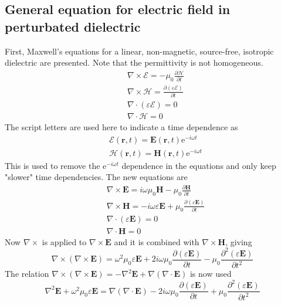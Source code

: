 \documentclass[10pt,a4paper]{eitExjobb}
\begin{document}
	\subsection{General equation for electric field in perturbated dielectric}
	First, Maxwell's equations for a linear, non-magnetic, source-free, isotropic dielectric are presented. Note that the permittivity is not homogeneous.
	\begin{align*}
	&\nabla \times \bm{\mathcal{E}} = -\mu_0 \frac{\partial \bm{\mathcal{H}}}{\partial t} \\
	&\nabla \times \bm{\mathcal{H}} = \frac{\partial (\varepsilon \bm{\mathcal{E}})}{\partial t} \\
	&\nabla \cdot (\varepsilon \bm{\mathcal{E}}) = 0 \\
	&\nabla \cdot \bm{\mathcal{H}} = 0
	\end{align*}
	The script letters are used here to indicate a time dependence as
	\begin{align*}
	&\bm{\mathcal{E}}(\bm{r},t) = \bm{E}(\bm{r},t) \text{e}^{-i\omega t} \\
	&\bm{\mathcal{H}}(\bm{r},t) = \bm{H}(\bm{r},t) \text{e}^{-i\omega t}
	\end{align*}
	This is used to remove the e$^{-i\omega t}$ dependence in the equations and only keep "slower" time dependencies. The new equations are
	\begin{align*}
	&\nabla \times \bm{E} = i\omega \mu_0 \bm{H} - \mu_0 \frac{\partial \bm{H}}{\partial t} \\
	&\nabla \times \bm{H} = -i\omega \varepsilon \bm{E} + \mu_0 \frac{\partial (\varepsilon \bm{E})}{\partial t} \\
	&\nabla \cdot (\varepsilon \bm{E}) = 0 \\
	&\nabla \cdot \bm{H} = 0
	\end{align*}
	Now $\nabla \times$ is applied to $\nabla \times \bm{E}$ and it is combined with $\nabla \times \bm{H}$, giving
	\begin{equation*}
	\nabla \times (\nabla \times \bm{E}) = \omega^2 \mu_0 \varepsilon \bm{E} + 2i\omega \mu_0 \frac{\partial (\varepsilon \bm{E})}{\partial t} - \mu_0 \frac{\partial^2 (\varepsilon \bm{E})}{\partial t^2}
	\end{equation*}
	The relation $\nabla \times (\nabla \times \bm{E}) = -\nabla^2\bm{E} + \nabla(\nabla \cdot \bm{E})$ is now used
	\begin{equation*}
	\nabla^2\bm{E} + \omega^2 \mu_0 \varepsilon \bm{E} = \nabla(\nabla \cdot \bm{E}) - 2i\omega \mu_0 \frac{\partial (\varepsilon \bm{E})}{\partial t} + \mu_0 \frac{\partial^2 (\varepsilon \bm{E})}{\partial t^2}
	\end{equation*}
\end{document}
